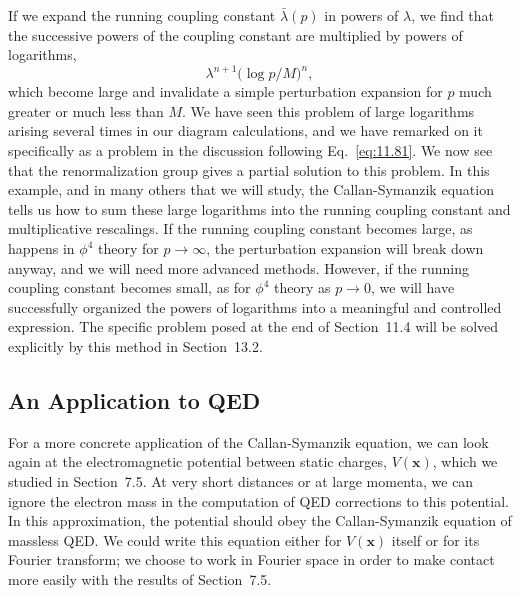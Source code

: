 If we expand the running coupling constant $\bar{\lambda}(p)$ in powers of
$\lambda$, we find that the successive powers of the coupling constant are
multiplied by powers of logarithms,
\begin{equation}
  \lambda^{n+1}\bigl( \log p/M \bigr)^n ,
\end{equation}
which become large and invalidate a simple perturbation expansion for $p$
much greater or much less than $M$.  We have seen this problem of large
logarithms arising several times in our diagram calculations, and we have
remarked on it specifically as a problem in the discussion following
Eq.~\eqref{eq:11.81}.  We now see that the renormalization group gives a
partial solution to this problem.  In this example, and in many others that
we will study, the Callan-Symanzik equation tells us how to sum these large
logarithms into the running coupling constant and multiplicative rescalings.
If the running coupling constant becomes large, as happens in $\phi^4$ theory
for $p\to\infty$, the perturbation expansion will break down anyway, and we
will need more advanced methods.  However, if the running coupling constant
becomes small, as for $\phi^4$ theory as $p\to 0$, we will have successfully
organized the powers of logarithms into a meaningful and controlled
expression.  The specific problem posed at the end of Section~11.4 will be
solved explicitly by this method in Section~13.2.

\subsection{An Application to QED}

For a more concrete application of the Callan-Symanzik equation, we can look
again at the electromagnetic potential between static charges, $V(\mathbf{x})$,
which we studied in Section~7.5.  At very short distances or at large
momenta, we can ignore the electron mass in the computation of QED
corrections to this potential.  In this approximation, the potential should
obey the Callan-Symanzik equation of massless QED.  We could write this
equation either for $V(\mathbf{x})$ itself or for its Fourier transform; we
choose to work in Fourier space in order to make contact more easily with the
results of Section~7.5.

